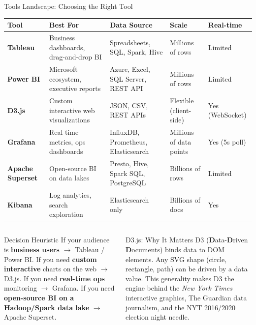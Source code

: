 \documentclass[aspectratio=169,10pt]{beamer}
\begin{document}
\begin{frame}{Tools Landscape: Choosing the Right Tool}
  \centering
  \renewcommand{\arraystretch}{1.5}
  \begin{tabular}{p{2.4cm}p{2.8cm}p{3.2cm}p{2.0cm}p{1.6cm}}
    \toprule
    \textbf{Tool} & \textbf{Best For} & \textbf{Data Source} & \textbf{Scale} & \textbf{Real-time} \\
    \midrule
    \textbf{Tableau} &
      Business dashboards, drag-and-drop BI &
      Spreadsheets, SQL, Spark, Hive &
      Millions of rows &
      Limited \\
    \textbf{Power BI} &
      Microsoft ecosystem, executive reports &
      Azure, Excel, SQL Server, REST API &
      Millions of rows &
      Limited \\
    \textbf{D3.js} &
      Custom interactive web visualizations &
      JSON, CSV, REST APIs &
      Flexible (client-side) &
      Yes (WebSocket) \\
    \textbf{Grafana} &
      Real-time metrics, ops dashboards &
      InfluxDB, Prometheus, Elasticsearch &
      Millions of data points &
      Yes (5s poll) \\
    \textbf{Apache Superset} &
      Open-source BI on data lakes &
      Presto, Hive, Spark SQL, PostgreSQL &
      Billions of rows &
      Limited \\
    \textbf{Kibana} &
      Log analytics, search exploration &
      Elasticsearch only &
      Billions of docs &
      Yes \\
    \bottomrule
  \end{tabular}
  \vspace{8pt}
  \begin{columns}[T]
      \begin{block}{Decision Heuristic}
        \small If your audience is \textbf{business users} $\to$ Tableau / Power BI.  If you need \textbf{custom interactive} charts on the web $\to$ D3.js.  If you need \textbf{real-time ops} monitoring $\to$ Grafana.  If you need \textbf{open-source BI on a Hadoop/Spark data lake} $\to$ Apache Superset.
      \end{block}
      \begin{alertblock}{D3.js: Why It Matters}
        \small D3 (\textbf{D}ata-\textbf{D}riven \textbf{D}ocuments) binds data to DOM elements.  Any SVG shape (circle, rectangle, path) can be driven by a data value.  This generality makes D3 the engine behind the \textit{New York Times} interactive graphics, The Guardian data journalism, and the NYT 2016/2020 election night needle.
      \end{alertblock}
  \end{columns}
\end{frame}
\end{document}
